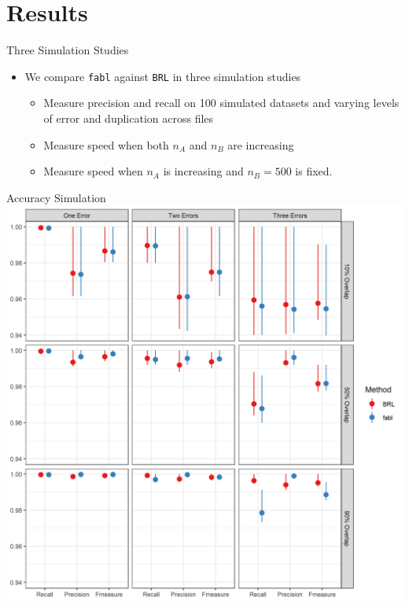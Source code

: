 \documentclass{beamer}
\begin{document}
\section{Results}

\begin{frame}{Three Simulation Studies}
	\begin{itemize}
		\item We compare \texttt{fabl} against \texttt{BRL} in three simulation studies
		\begin{itemize}
			\item Measure precision and recall on 100 simulated datasets and varying levels of error and duplication across files
			\item Measure speed when both $n_A$ and $n_B$ are increasing
			\item Measure speed when $n_A$ is increasing and $n_B = 500$ is fixed. 
		\end{itemize}
	\end{itemize}
\end{frame}

	\begin{frame}{Accuracy Simulation}
	\includegraphics[width = \textwidth, height = .7\textwidth ]{../notes/figures/sadinle_sim_plot.png}
\end{frame}
\end{document}
